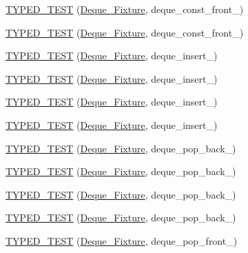 \begin{DoxyCompactItemize}
\item 
\hyperlink{TestDeque_8c_09_09_a0a5c01fd911d2bf8f1fd5c3bc6150492}{T\-Y\-P\-E\-D\-\_\-\-T\-E\-S\-T} (\hyperlink{structDeque__Fixture}{Deque\-\_\-\-Fixture}, deque\-\_\-const\-\_\-front\-\_)
\item 
\hyperlink{TestDeque_8c_09_09_a440b10996c4a5c41198ecac83e235364}{T\-Y\-P\-E\-D\-\_\-\-T\-E\-S\-T} (\hyperlink{structDeque__Fixture}{Deque\-\_\-\-Fixture}, deque\-\_\-const\-\_\-front\-\_)
\item 
\hyperlink{TestDeque_8c_09_09_a45cd285ca340e32c08fda47eba23e99e}{T\-Y\-P\-E\-D\-\_\-\-T\-E\-S\-T} (\hyperlink{structDeque__Fixture}{Deque\-\_\-\-Fixture}, deque\-\_\-insert\-\_)
\item 
\hyperlink{TestDeque_8c_09_09_aaab9f66af0b41dbf492c3d57bd2ab162}{T\-Y\-P\-E\-D\-\_\-\-T\-E\-S\-T} (\hyperlink{structDeque__Fixture}{Deque\-\_\-\-Fixture}, deque\-\_\-insert\-\_)
\item 
\hyperlink{TestDeque_8c_09_09_a965141459bd0b7e7b7617efda6edbbcd}{T\-Y\-P\-E\-D\-\_\-\-T\-E\-S\-T} (\hyperlink{structDeque__Fixture}{Deque\-\_\-\-Fixture}, deque\-\_\-insert\-\_)
\item 
\hyperlink{TestDeque_8c_09_09_ab68ed8d8a8e58402ce3a30e83095cc5b}{T\-Y\-P\-E\-D\-\_\-\-T\-E\-S\-T} (\hyperlink{structDeque__Fixture}{Deque\-\_\-\-Fixture}, deque\-\_\-insert\-\_)
\item 
\hyperlink{TestDeque_8c_09_09_aabd7a8dc5d4e8112e46dc7964640e04d}{T\-Y\-P\-E\-D\-\_\-\-T\-E\-S\-T} (\hyperlink{structDeque__Fixture}{Deque\-\_\-\-Fixture}, deque\-\_\-pop\-\_\-back\-\_)
\item 
\hyperlink{TestDeque_8c_09_09_a50cfd0de82695acc9809af70dbfe7b47}{T\-Y\-P\-E\-D\-\_\-\-T\-E\-S\-T} (\hyperlink{structDeque__Fixture}{Deque\-\_\-\-Fixture}, deque\-\_\-pop\-\_\-back\-\_)
\item 
\hyperlink{TestDeque_8c_09_09_a5f89d88995453d162329f1b8085203d2}{T\-Y\-P\-E\-D\-\_\-\-T\-E\-S\-T} (\hyperlink{structDeque__Fixture}{Deque\-\_\-\-Fixture}, deque\-\_\-pop\-\_\-back\-\_)
\item 
\hyperlink{TestDeque_8c_09_09_a5ef2f596648b0229116d836f94abdc15}{T\-Y\-P\-E\-D\-\_\-\-T\-E\-S\-T} (\hyperlink{structDeque__Fixture}{Deque\-\_\-\-Fixture}, deque\-\_\-pop\-\_\-back\-\_)
\item 
\hyperlink{TestDeque_8c_09_09_a4c255ac42d84f7be44b352d9b03c5cce}{T\-Y\-P\-E\-D\-\_\-\-T\-E\-S\-T} (\hyperlink{structDeque__Fixture}{Deque\-\_\-\-Fixture}, deque\-\_\-pop\-\_\-front\-\_)
\item 

\end{DoxyCompactItemize}
